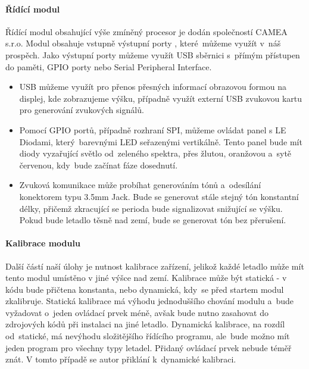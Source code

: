 			\paragraph{Řídící modul}
				Řídící modul obsahující výše zmíněný procesor je dodán společností CAMEA s.r.o. Modul obsahuje vstupně výstupní porty , které~můžeme využít v~náš prospěch. Jako výstupní porty můžeme využít USB sběrnici s~přímým přístupen do paměti, GPIO porty nebo Serial Peripheral Interface. 
				\begin{itemize}
					\item USB můžeme využít pro přenos přesných informací obrazovou formou na displej, kde zobrazujeme výšku, případně využít externí USB zvukovou kartu pro generování zvukových signálů. 
					
					\item Pomocí GPIO portů, případně rozhraní SPI, můžeme ovládat panel s LE Diodami, který~barevnými LED seřazenými vertikálně. Tento panel bude mít diody vyzařující světlo od~zeleného spektra, přes žlutou, oranžovou a~sytě červenou, kdy~bude začínat fáze dosednutí.
					
					\item Zvuková komunikace může probíhat generováním tónů a~odesílání konektorem typu 3.5mm Jack. Bude se generovat stále stejný tón konstantní délky, přičemž zkracující se perioda bude signalizovat snižující se výšku. Pokud bude letadlo těsně nad zemí, bude se generovat tón bez přerušení.
				\end{itemize}
			
			\paragraph{Kalibrace modulu}
				Další částí naší úlohy je nutnost kalibrace zařízení, jelikož každé letadlo může mít tento modul umístěno v jiné výšce nad zemí. Kalibrace může být statická - v kódu bude přičtena konstanta, nebo dynamická, kdy~se před startem modul zkalibruje. Statická kalibrace má výhodu jednoduššího chování modulu a~bude vyžadovat o~jeden ovládací prvek méně, avšak bude nutno zasahovat do zdrojových kódů při instalaci na jiné letadlo. Dynamická kalibrace, na rozdíl od~statické, má nevýhodu složitějšího řídícího programu, ale~bude možno mít jeden program pro všechny typy letadel. Přidaný ovládací prvek nebude téměř znát. V tomto případě se autor přiklání k~dynamické kalibraci.
				
